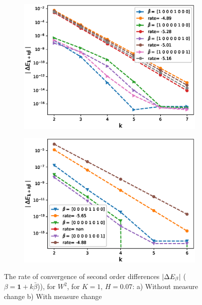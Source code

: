\documentclass[11pt]{article}
\begin{document}
 
 \begin{figure}[!h]
 	\centering
 	\begin{subfigure}{.4\textwidth}
 		\centering
 		\includegraphics[width=1\linewidth]{./figures/rBergomi_mixed_error_rates/without_change_measure/N_4/H_007/mixed_difference_order2_rbergomi_4steps_H_007_K_1_totally_hierarch_with_rate_W2}
 		\caption{}
 		\label{fig:sub3}
 	\end{subfigure}%
 	\begin{subfigure}{.4\textwidth}
 		\centering
 		\includegraphics[width=1\linewidth]{./figures/rBergomi_mixed_error_rates/partial_change_measure/N_4/H_007/mixed_difference_order2_rbergomi_4steps_H_007_K_1_totally_hierarch_with_rate_W2_change_measure_part_spec}
 		\caption{}
 		\label{fig:sub4}
 	\end{subfigure}
 	
 	\caption{The rate of convergence of  second order differences $\left\lvert\Delta E_{\beta}\right\rvert$ ($\beta=\mathbf{1}+k \bar{\beta}$)), for $W^2$, for $K=1$, $H=0.07$: a) Without measure change b) With measure change}
 	\label{fig:second_diff_comp_K_1_H_007_W_2}
 \end{figure}
 
\end{document}
